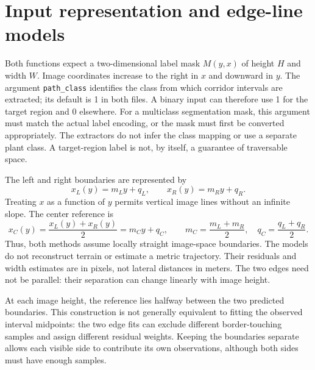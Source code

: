 
\section{Input representation and edge-line models}
\label{sec:c4_input}

Both functions expect a two-dimensional label mask $M(y,x)$ of height $H$
and width $W$. Image coordinates increase to the right in $x$ and downward
in $y$. The argument \texttt{path\_class} identifies the class from which
corridor intervals are extracted; its default is 1 in both files. A
binary input can therefore use 1 for the target region and 0 elsewhere.
For a multiclass segmentation mask, this argument must match the actual
label encoding, or the mask must first be converted appropriately. The
extractors do not infer the class mapping or use a separate plant class.
A target-region label is not, by itself, a guarantee of traversable space.

The left and right boundaries are represented by
\begin{equation}
    x_L(y)=m_Ly+q_L, \qquad x_R(y)=m_Ry+q_R.
    \label{eq:c4_edges}
\end{equation}
Treating $x$ as a function of $y$ permits vertical image lines without an
infinite slope. The center reference is
\begin{equation}
    x_C(y)=\frac{x_L(y)+x_R(y)}{2}=m_Cy+q_C,
    \qquad m_C=\frac{m_L+m_R}{2},\quad q_C=\frac{q_L+q_R}{2}.
    \label{eq:c4_line}
\end{equation}
Thus, both methods assume locally straight image-space boundaries.
The models do not reconstruct terrain or estimate a metric trajectory.
Their residuals and width estimates are in pixels, not lateral distances
in meters. The two edges need not be parallel: their separation can
change linearly with image height.

At each image height, the reference lies halfway between the two
predicted boundaries. This construction is not generally equivalent to
fitting the observed interval midpoints: the two edge fits can exclude
different border-touching samples and assign different residual weights.
Keeping the boundaries separate allows each visible side to contribute
its own observations, although both sides must have enough samples.

